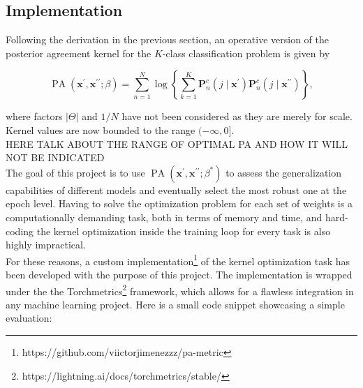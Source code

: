 \subsection{Implementation}

Following the derivation in the previous section, an operative version of the 
posterior agreement kernel for the $K$-class classification problem is given by

$$
\operatorname{PA}\left(\boldsymbol{x}^{\prime}, \boldsymbol{x}^{\prime \prime} ; \beta\right)=\sum_{n=1}^N \log \left\{ \sum_{k=1}^K \mathbf{P}_n^c\left(j \mid \boldsymbol{x}^{\prime}\right) \mathbf{P}_n^c\left(j \mid \boldsymbol{x}^{\prime \prime}\right)\right\},
$$

where factors $|\Theta|$ and $1/N$ have not been considered as they are merely for
scale. Kernel values are now bounded to the range $(-\infty, 0]$. \\

HERE TALK ABOUT THE RANGE OF OPTIMAL PA AND HOW IT WILL NOT BE INDICATED \\

The goal of this project is to use $\operatorname{PA}\left(\boldsymbol{x}^{\prime}, \boldsymbol{x}^{\prime \prime} ; \beta^{*}\right)$
to assess the generalization capabilities of different models and eventually select the most robust one at
the epoch level. Having to solve the optimization problem for each set of weights is a 
computationally demanding task, both in terms of memory and time, and hard-coding the 
kernel optimization inside the training loop for every task
is also highly impractical. \\

For these reasons, a custom implementation\footnote{https://github.com/viictorjimenezzz/pa-metric} of the kernel optimization task has been
developed with the purpose of this project. The implementation is wrapped under the
the Torchmetrics\footnote{https://lightning.ai/docs/torchmetrics/stable/}
framework, which allows for a flawless integration in any machine learning project.
Here is a small code snippet showcasing a simple evaluation: \\



